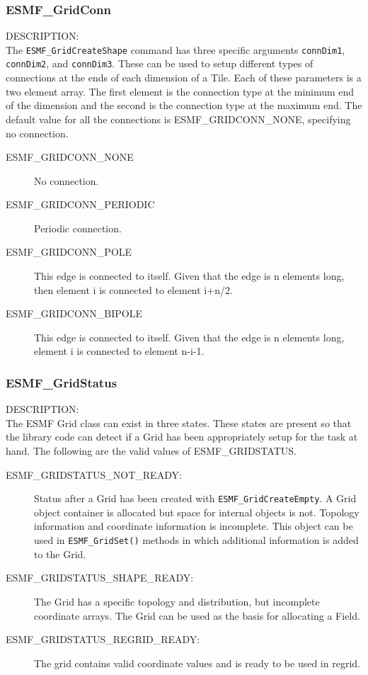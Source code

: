 
\subsubsection{ESMF\_GridConn}
\label{sec:opt:gridconn}
{\sf DESCRIPTION:\\}
The {\tt ESMF\_GridCreateShape} command has three specific arguments
{\tt connDim1}, {\tt connDim2}, and {\tt connDim3}. These can be used
to setup different types of connections at the ends of each dimension
of a Tile.  Each of these parameters is a two element array. The first
element is the connection type at the minimum end of the dimension
and the second is the connection type at the maximum end. The default
value for all the connections is ESMF\_GRIDCONN\_NONE, specifying no
connection.

\medskip
\begin{description}
\item [ESMF\_GRIDCONN\_NONE] No connection.

\item [ESMF\_GRIDCONN\_PERIODIC] Periodic connection.

\item [ESMF\_GRIDCONN\_POLE] This edge is connected to itself. Given
that the edge is n elements long, then element i is connected to
element i+n/2.

\item [ESMF\_GRIDCONN\_BIPOLE] This edge is connected to itself. Given
that the edge is n elements long, element i is connected to element n-i-1.

\end{description}

\subsubsection{ESMF\_GridStatus}\label{sec:opt:gridstatus}

 {\sf DESCRIPTION:\\}
The ESMF Grid class can exist in three states. These states are
present so that the library code can detect if a Grid has been
appropriately setup for the task at hand. The following
are the valid values of ESMF\_GRIDSTATUS.

\medskip
\begin{description}
\item [ESMF\_GRIDSTATUS\_NOT\_READY:] Status after a Grid has been created with 
      {\tt ESMF\_GridCreateEmpty}.  A Grid object container is allocated but
      space for internal objects is not.  Topology information and coordinate
      information is incomplete.  This object can be used in {\tt ESMF\_GridSet()}
      methods in which additional information is added to the Grid.
\item [ESMF\_GRIDSTATUS\_SHAPE\_READY:] The Grid has a specific topology and
      distribution, but incomplete coordinate arrays.  The Grid can be used
      as the basis for allocating a Field.
\item [ESMF\_GRIDSTATUS\_REGRID\_READY:] The grid contains valid coordinate
      values and is ready to be used in regrid. 
\end{description}


